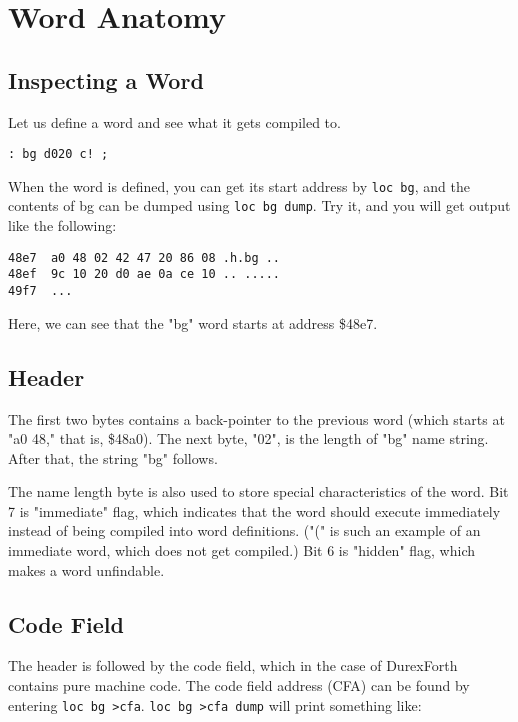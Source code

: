 \chapter{Word Anatomy}

\section{Inspecting a Word}

Let us define a word and see what it gets compiled to.

\begin{verbatim}
: bg d020 c! ;
\end{verbatim}

When the word is defined, you can get its start address by \texttt{loc bg}, and the contents of bg can be dumped using \texttt{loc bg dump}. Try it, and you will get output like the following:

\begin{verbatim}
48e7  a0 48 02 42 47 20 86 08 .h.bg ..
48ef  9c 10 20 d0 ae 0a ce 10 .. .....
49f7  ...
\end{verbatim}

Here, we can see that the "bg" word starts at address \$48e7.

\section{Header}

The first two bytes contains a back-pointer to the previous word (which starts at "a0 48," that is, \$48a0). The next byte, "02", is the length of "bg" name string. After that, the string "bg" follows.

The name length byte is also used to store special characteristics of the word. Bit 7 is "immediate" flag, which indicates that the word should execute immediately instead of being compiled into word definitions. ("(" is such an example of an immediate word, which does not get compiled.) Bit 6 is "hidden" flag, which makes a word unfindable.

\section{Code Field}

The header is followed by the code field, which in the case of DurexForth contains pure machine code. The code field address (CFA) can be found by entering \texttt{loc bg >cfa}. \texttt{loc bg >cfa dump} will print something like:

